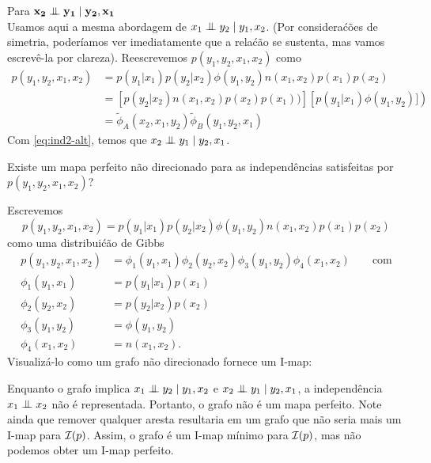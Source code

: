 \begin{exenumerate}
\begin{solution}
    \vspace{2ex}
    Para $\mathbf{x_2 \mathrel{\perp\mspace{-10mu}\perp} y_1 \mid y_2, x_1}$\\ Usamos aqui a mesma abordagem de $x_1 \mathrel{\perp\mspace{-10mu}\perp} y_2 \mid y_1, x_2$. (Por considera\'c\~oes de simetria, poder\'iamos ver imediatamente que a rela\'c\~ao se sustenta, mas vamos escrev\^e-la por clareza). Reescrevemos $p(y_1,y_2,x_1,x_2)$ como
    \begin{align}
        p(y_1,y_2,x_1,x_2) & =  p(y_1 | x_1) p(y_2 | x_2) \phi(y_1,y_2) n(x_1,x_2) p(x_1) p(x_2)\\
        & =  \left[  p(y_2 | x_2)  n(x_1,x_2) p(x_2)p(x_1) )\right]\left[ p(y_1 | x_1) \phi(y_1,y_2) ]\right)\\
        & = \tilde{\phi}_A(x_2,x_1,y_2) \tilde{\phi}_B(y_1,y_2,x_1)
    \end{align}
    Com \eqref{eq:ind2-alt}, temos que $x_2 \mathrel{\perp\mspace{-10mu}\perp} y_1 \mid y_2,x_1$. 
    
\end{solution}


\item Existe um mapa perfeito n\~ao direcionado para as independ\^encias satisfeitas por $p(y_1,y_2,x_1,x_2)$?

\begin{solution}
    Escrevemos 
    $$p(y_1,y_2,x_1,x_2) = p(y_1 | x_1) p(y_2 | x_2) \phi(y_1,y_2) n(x_1,x_2) p(x_1) p(x_2)$$
    como uma distribui\'c\~ao de Gibbs
    \begin{align}
        p(y_1,y_2,x_1,x_2) & = \phi_1(y_1,x_1) \phi_2(y_2,x_2) \phi_3(y_1,y_2) \phi_4(x_1,x_2) \quad \quad \text{com} \\
        \phi_1(y_1,x_1) & =p(y_1 | x_1)p(x_1)   \\
        \phi_2(y_2,x_2)& =  p(y_2 | x_2)p(x_2)\\
        \phi_3(y_1,y_2)& =  \phi(y_1,y_2) \\
        \phi_4(x_1,x_2)& = n(x_1,x_2). 
    \end{align}
    Visualiz\'a-lo como um grafo n\~ao direcionado fornece um I-map:
    \begin{center}
    \end{center}
    Enquanto o grafo implica $x_1 \mathrel{\perp\mspace{-10mu}\perp} y_2 \mid y_1, x_2$ e $x_2 \mathrel{\perp\mspace{-10mu}\perp} y_1 \mid y_2, x_1$, a independ\^encia $x_1 \mathrel{\perp\mspace{-10mu}\perp} x_2$ n\~ao \'e representada. Portanto, o grafo n\~ao \'e um mapa perfeito. Note ainda que remover qualquer aresta resultaria em um grafo que n\~ao seria mais um I-map para $\mathcal{I}(p)$. Assim, o grafo \'e um I-map m\'inimo para $\mathcal{I}(p)$, mas n\~ao podemos obter um I-map perfeito.
    

\end{solution}
\end{exenumerate}
